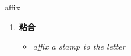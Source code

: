 
\begin{frame}
{\huge affix}
\begin{center}
\begin{enumerate}\Large
  \item \textbf{粘合}
  \begin{itemize}
    \item \em{\Large{affix a stamp to the letter}}
  \end{itemize}
\end{enumerate}
\end{center}
\end{frame}
